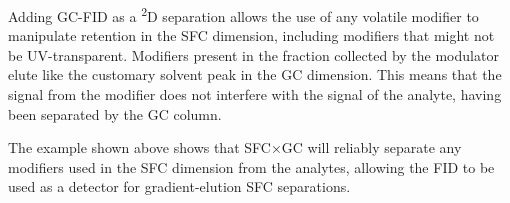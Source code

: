 Adding GC-FID as a \textsuperscript{2}D separation allows the use of any volatile
modifier to manipulate retention in the SFC dimension, including modifiers that
might not be UV-transparent. Modifiers present in the fraction collected
by the modulator elute like the customary solvent peak in the GC dimension.
This means that the signal from the modifier does not interfere with the signal
of the analyte, having been separated by the GC column.

The example shown above shows that SFC×GC will reliably separate any modifiers
used in the SFC dimension from the analytes, allowing the FID to be used as a
detector for gradient-elution SFC separations.

